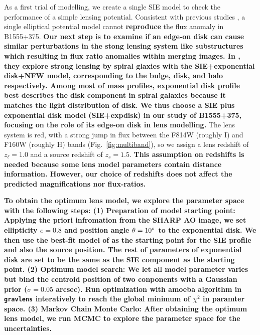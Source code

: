 \documentclass[useAMS,usenatbib]{mn2e}
\begin{document}
As a first trial of modelling, we create a single SIE model to check
the performance of a simple lensing potential. Consistent with
previous studies \citep{Marlow99, Xu14}, a single elliptical
potential model cannot \textbf{reproduce} the flux anomaly in B1555+375.
\textbf{Our next step is to examine if an edge-on disk can cause similar perturbations in the stong lensing system like substructures which resulting in flux ratio anomalies within merging images. In \citet{Kee98}, they explore strong lensing by spiral glaxies with the SIE+exponential disk+NFW model, corresponding to the bulge, disk, and halo respectively. Among most of mass profiles, exponential disk profile best describes the disk component in spiral galaxies because it matches the light distribution of disk. We thus choose a SIE plus exponential disk model (SIE+expdisk) in our study of B1555+375, focusing on the role of its edge-on disk in lens modelling. }
The lens system is red, with a strong jump in flux between the F814W
(roughly I) and F160W (roughly H) bands (Fig.~\ref{fig:multiband}), so
we assign a lens redshift of $z_\ell = 1.0$ and a source redshift of
$z_s =1.5$. \textbf{This assumption on redshifts is needed because some lens model parameters contain distance information. However, our choice of redshifts does not affect the predicted magnifications nor flux-ratios.} 

\textbf{To obtain the optimum lens model, we explore the parameter space with the following steps: 
(1) Preparation of model starting point: Applying the priori infromation from the SHARP AO image, we set ellipticity $e=0.8$ and position angle $\theta=10 \hbox{$^\circ$}$ to the exponential disk. We then use the best-fit model of \citet{Marlow99} as the starting point for the SIE profile and also the source position. The rest of parameters of exponential disk are set to be the same as the SIE component as the starting point.
(2) Optimum model search: We let all model parameter varies but bind the centroid position of two conponents with a Gaussian prior ($\sigma = 0.05 $ arcsec). Run optimization with amoeba algorithm in {\tt gravlens} interatively to reach the global minimum of $\chi^2$ in paramter space.
(3) Markov Chain Monte Carlo: After obtaining the optimum lens model, we run MCMC to explore the parameter space for the uncertainties.} 
\end{document}

